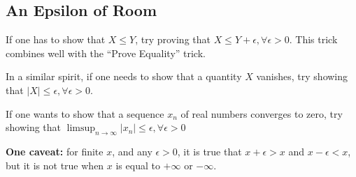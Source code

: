 \documentclass{article}
\newcommand{\smallmarginpar}[1]{\marginpar[#1]{\small{#1}}}
\begin{document}
\subsection{An Epsilon of Room}
If one has to show that $X \le Y$, try proving that $X \le Y + \epsilon, \forall \epsilon > 0$. This trick combines well with the ``Prove Equality'' trick.

In a similar spirit, if one needs to show that a quantity $X$ vanishes, try showing that $|X| \le \epsilon, \forall \epsilon > 0$.

If one wants to show that a sequence $x_n$ of real numbers converges to zero, try showing that $\limsup_{n \to \infty} |x_n| \le \epsilon, \forall \epsilon > 0$

{\bf{One caveat:}} for finite $x$, and any $\epsilon > 0$, it is true that $x + \epsilon > x$ and $x - \epsilon < x$, but it is not true when $x$ is equal to $+\infty$ or $-\infty$. \smallmarginpar{\textdbend}
\end{document}
